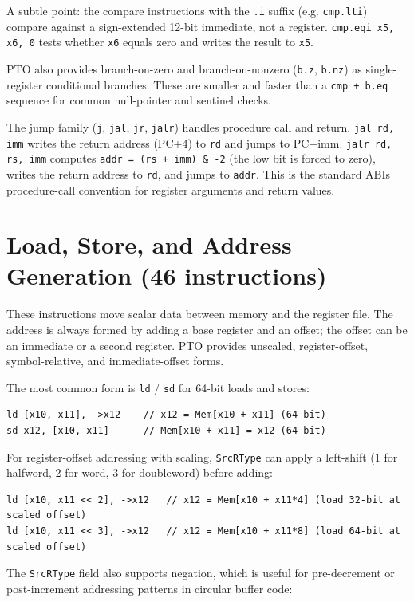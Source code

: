 A subtle point: the compare instructions with the \texttt{.i} suffix (e.g. \texttt{cmp.lti}) compare against a sign-extended 12-bit immediate, not a register. \texttt{cmp.eqi x5, x6, 0} tests whether \texttt{x6} equals zero and writes the result to \texttt{x5}.

PTO also provides branch-on-zero and branch-on-nonzero (\texttt{b.z}, \texttt{b.nz}) as single-register conditional branches. These are smaller and faster than a \texttt{cmp + b.eq} sequence for common null-pointer and sentinel checks.

The jump family (\texttt{j}, \texttt{jal}, \texttt{jr}, \texttt{jalr}) handles procedure call and return. \texttt{jal rd, imm} writes the return address (PC+4) to \texttt{rd} and jumps to PC+imm. \texttt{jalr rd, rs, imm} computes \texttt{addr = (rs + imm) \& -2} (the low bit is forced to zero), writes the return address to \texttt{rd}, and jumps to \texttt{addr}. This is the standard ABIs procedure-call convention for register arguments and return values.

\section{Load, Store, and Address Generation (46 instructions)}
These instructions move scalar data between memory and the register file. The address is always formed by adding a base register and an offset; the offset can be an immediate or a second register. PTO provides unscaled, register-offset, symbol-relative, and immediate-offset forms.

The most common form is \texttt{ld} / \texttt{sd} for 64-bit loads and stores:

\begin{lstlisting}[style=ptoscalarcode]
ld [x10, x11], ->x12    // x12 = Mem[x10 + x11] (64-bit)
sd x12, [x10, x11]      // Mem[x10 + x11] = x12 (64-bit)
\end{lstlisting}

For register-offset addressing with scaling, \texttt{SrcRType} can apply a left-shift (1 for halfword, 2 for word, 3 for doubleword) before adding:

\begin{lstlisting}[style=ptoscalarcode]
ld [x10, x11 << 2], ->x12   // x12 = Mem[x10 + x11*4] (load 32-bit at scaled offset)
ld [x10, x11 << 3], ->x12   // x12 = Mem[x10 + x11*8] (load 64-bit at scaled offset)
\end{lstlisting}

The \texttt{SrcRType} field also supports negation, which is useful for pre-decrement or post-increment addressing patterns in circular buffer code:

